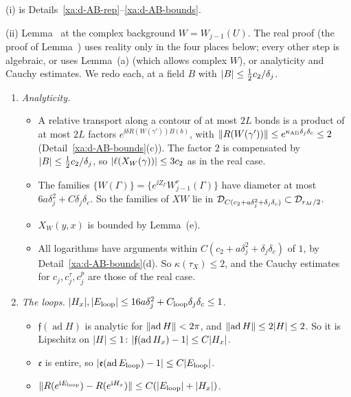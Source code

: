 \begin{detail}\label{xa:d-AB-ii}
(i) is Details~\ref{xa:d-AB-rep}--\ref{xa:d-AB-bounds}.

(ii) Lemma~ at the complex background $W=W_{j-1}(U)$. The real proof (the proof of Lemma~) uses reality only in the four places below; every other step is algebraic, or uses Lemma~(a) (which allows complex $W$), or analyticity and Cauchy estimates. We redo each, at a field $B$ with $\lvert B\rvert\le\frac12c_2/\delta_j$.
\begin{enumerate}[label=(\arabic*)]
\item \emph{Analyticity.}
  \begin{itemize}
  \item A relative transport along a contour of at most $2L$ bonds is a product of at most $2L$ factors $e^{\ii\delta R(W(\gamma'))B(b)}$, with $\lVert R(W(\gamma'))\rVert\le e^{\kappa_{\rm AB}\delta_j\delta_c}\le2$ (Detail~\ref{xa:d-AB-bounds}(c)). The factor $2$ is compensated by $\lvert B\rvert\le\frac12c_2/\delta_j$, so $\lvert\ell(X_W(\gamma))\rvert\le3c_2$ as in the real case.
  \item The families $\{W(\Gamma)\}=\{e^{\ii Z_\Gamma}W^r_{j-1}(\Gamma)\}$ have diameter at most $6a\delta_j^2+C\delta_j\delta_c$. So the families of $XW$ lie in $\mathcal D_{C(c_2+a\delta_j^2+\delta_j\delta_c)}\subset\mathcal D_{r_M/2}$.
  \item $X_W(y,x)$ is bounded by Lemma~(e).
  \item All logarithms have arguments within $C(c_2+a\delta_j^2+\delta_j\delta_c)$ of $1$, by Detail~\ref{xa:d-AB-bounds}(d). So $\kappa(\tau_X)\le2$, and the Cauchy estimates for $c_j,c^\tau_j,c^p_j$ are those of the real case.
  \end{itemize}
\item \emph{The loops.} $\lvert H_x\rvert,\lvert E_{\rm loop}\rvert\le16a\delta_j^2+C_{\rm loop}\delta_j\delta_c\le1$.
  \begin{itemize}
  \item $\mathfrak f(\operatorname{ad}H)$ is analytic for $\lVert\operatorname{ad}H\rVert<2\pi$, and $\lVert\operatorname{ad}H\rVert\le2\lvert H\rvert\le2$. So it is Lipschitz on $\lvert H\rvert\le1$: $\lvert\mathfrak f(\operatorname{ad}H_x)-1\rvert\le C\lvert H_x\rvert$.
  \item $\mathfrak e$ is entire, so $\lvert\mathfrak e(\operatorname{ad}E_{\rm loop})-1\rvert\le C\lvert E_{\rm loop}\rvert$.
  \item $\lVert R(e^{\mathrm i E_{\rm loop}})-R(e^{\mathrm i H_x})\rVert\le C(\lvert E_{\rm loop}\rvert+\lvert H_x\rvert)$.

\end{itemize}
\end{enumerate}
\end{detail}
